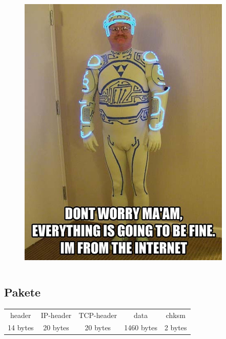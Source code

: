 \documentclass{beamer}
\begin{document}
\begin{frame}
\begin{columns}
\begin{column}{0.4\textwidth}
\begin{figure}[ht]
					\href{https://c1.staticflickr.com/1/84/231641275_17c37e3601.jpg\# this-image-is-creative-commons}{\includegraphics[width=\textwidth,height=0.65\textheight,keepaspectratio]{./images/im-from-the-internet}}
				\end{figure}
			\end{column}
		\end{columns}
	\end{frame}
	\subsection{Pakete}
	\begin{frame}
		\footnotesize
		\begin{tabular}{|c|c|c|c|c|}
			\hline
			header & IP-header & TCP-header & data & chksm\\
			14 bytes & 20 bytes & 20 bytes & \hspace{30pt}1460 bytes\hspace{30pt} & 2 bytes\\
			\hline
		\end{tabular}\\\vspace{1cm}
	\end{frame}
\end{document}
